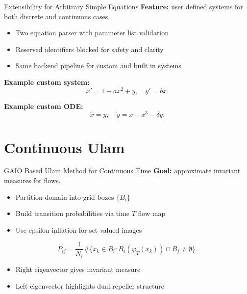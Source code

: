 \documentclass[aspectratio=169]{beamer}
\begin{document}
\begin{frame}{Extensibility for Arbitrary Simple Equations}
  \textbf{Feature:} user defined systems for both discrete and continuous cases.

  \vspace{4pt}
  \begin{itemize}
    \item Two equation parser with parameter list validation
    \item Reserved identifiers blocked for safety and clarity
    \item Same backend pipeline for custom and built in systems
  \end{itemize}

  \vspace{6pt}
  \textbf{Example custom system:}
  \begin{equation}
    x' = 1 - a x^2 + y, \quad y' = b x.
  \end{equation}

  \textbf{Example custom ODE:}
  \begin{equation}
    \dot{x} = y, \quad \dot{y} = x - x^3 - \delta y.
  \end{equation}
\end{frame}

\section{Continuous Ulam}

\begin{frame}{GAIO Based Ulam Method for Continuous Time}
  \textbf{Goal:} approximate invariant measures for flows.

  \vspace{4pt}
  \begin{itemize}
    \item Partition domain into grid boxes $\{B_i\}$
    \item Build transition probabilities via time $T$ flow map
    \item Use epsilon inflation for set valued images
  \end{itemize}

  \vspace{6pt}
  \begin{equation}
    P_{ij} = \frac{1}{N_i} \#\{x_k \in B_i : B_{\epsilon}(\varphi_T(x_k)) \cap B_j \ne \emptyset\}.
  \end{equation}

  \vspace{4pt}
  \begin{itemize}
    \item Right eigenvector gives invariant measure
    \item Left eigenvector highlights dual repeller structure
  \end{itemize}
\end{frame}
\end{document}
